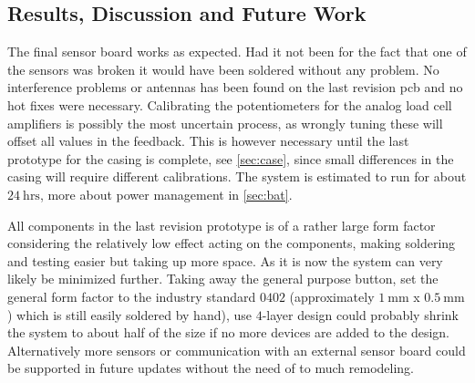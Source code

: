 \subsection{Results, Discussion and Future Work}\label{sec:hw:tip2}
The final sensor board works as expected. Had it not been for the fact that one of the sensors was broken it would have been soldered without any problem. No interference problems or antennas has been found on the last revision \gls{pcb} and no hot fixes were necessary.
Calibrating the potentiometers for the analog load cell amplifiers is possibly the most uncertain process, as wrongly tuning these will offset all values in the feedback. This is however necessary until the last prototype for the casing is complete, see \autoref{sec:case}, since small differences in the casing will require different calibrations.
The system is estimated to run for about $24~\textrm{hrs}$, more about power management in \autoref{sec:bat}. 

All components in the last revision prototype is of a rather large form factor considering the relatively low effect acting on the components, making soldering and testing easier but taking up more space. As it is now the system can very likely be minimized further. Taking away the general purpose button, set the general form factor to the industry standard $0402$ (approximately $1~\textrm{mm}$ x $0.5~\textrm{mm}$) which is still easily soldered by hand), use $4$-layer design could probably shrink the system to about half of the size if no more devices are added to the design. Alternatively more sensors or communication with an external sensor board could be supported in future updates without the need of to much remodeling. 


